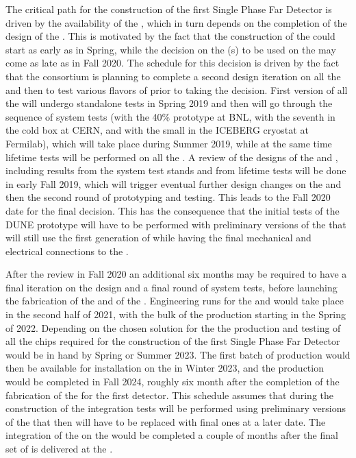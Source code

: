 The critical path for the construction of the first Single Phase
 Far Detector is driven by the availability of the ,
which in turn depends on the completion of the design of the
. This is motivated by the fact that the construction
of the  could start as early as in Spring, while the
decision on the (s) to be used on the 
may come as late as in Fall 2020. The schedule for this decision
is driven by the fact that the  consortium is
planning to complete a second design iteration on all the 
and then to test various flavors of  prior to taking
the decision. First version of all the  will undergo
standalone tests in Spring 2019 and then will go through the 
sequence of system tests (with the 40\%  prototype at BNL,
with the seventh   in the cold box at CERN,
and with the small  in the ICEBERG cryostat at Fermilab), which
will take place during Summer 2019, while at the same time lifetime
tests will be performed on all the . A review of the 
designs of the  and , including results
from the system test stands and from lifetime tests will be done
in early Fall 2019, which will trigger eventual further design
changes on the  and then the second round of prototyping
and testing. This leads to the Fall 2020 date for the final
 decision. This has the consequence that the initial
tests of the DUNE prototype  will have to be performed
with preliminary versions of the  that will still use
the first generation of  while having the final 
mechanical and electrical connections to the .

After the review in Fall 2020 an additional six months may be 
required to have a final iteration on the  design
and a final round of system tests, before launching the fabrication
of the  and of the . Engineering runs
for the  and  would take place in the
second half of 2021, with the bulk of the production starting in
the Spring of 2022. Depending on the chosen solution for the
 the production and testing of all the chips required
for the construction of the first Single Phase  Far Detector
would be in hand by Spring or Summer 2023. The first batch of
production  would then be available for installation on
the  in Winter 2023, and the production would be
completed in Fall 2024, roughly six month after the completion
of the fabrication of the  for the first detector.
This schedule assumes that during the construction of the 
 integration tests will be performed using preliminary
versions of the  that then will have to be replaced
with final ones at a later date. The integration of the 
on the  would be completed a couple of months after
the final set of  is delivered at the .

